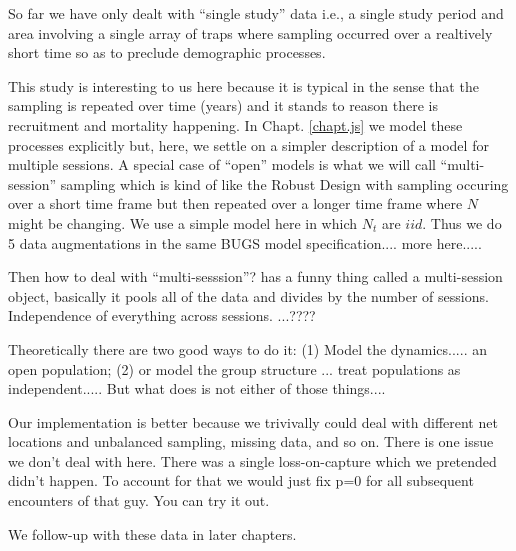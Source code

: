 So far we have only dealt with ``single study'' data i.e., a single
study period and area involving a single array of traps where sampling
occurred over a realtively short time so as to preclude demographic
processes.

This study is interesting to us here because it is typical in the
sense that the sampling is repeated over time (years) and it stands to
reason there is recruitment and mortality happening. In
Chapt. \ref{chapt.js} we model these processes explicitly but, here,
we settle on a simpler description of a model for multiple sessions.
A special case of ``open'' models is what we will call
``multi-session'' sampling which is kind of like the Robust Design
with sampling occuring over a short time frame but then repeated over
a longer time frame where $N$ might be changing.  We use a simple
model here in which $N_{t}$ are $iid$.
Thus we do 5 data augmentations in the same BUGS model
specification.... more here.....


Then how to deal with ``multi-sesssion''? \secr has a funny thing
called a multi-session object, basically it pools all of the data and
divides by the number of sessions. Independence of everything across
sessions. ...????

Theoretically there are two good ways to do it:  (1) Model the
dynamics..... an open population; (2) or model the group structure
... treat populations as independent.....
But what \secr does is not either of those things....

Our implementation is better because we trivivally could deal with
different net locations and unbalanced sampling, missing data, and so
on. There is one issue we don't deal with here. There was a single
loss-on-capture which we pretended didn't happen. To account for that
we would just fix p=0 for all subsequent encounters of that guy. You
can try it out.

We follow-up with these data in later chapters.

